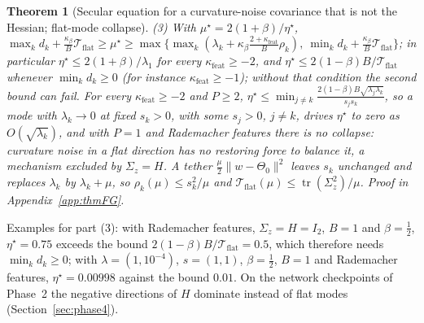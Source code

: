 \documentclass[11pt]{article}
\newtheorem{theorem}{Theorem}
\theoremstyle{remark}
\newcommand{\tr}{\operatorname{tr}}
\begin{document}
\begin{theorem}[Secular equation for a curvature-noise covariance that is not the Hessian; flat-mode collapse]
(3) With $\mu^\star=2(1+\beta)/\eta^\star$, $\max_kd_k+\frac{\kappa_\beta}{B}\mathcal T_{\mathrm{flat}}\ge\mu^\star\ge\max\big\{\max_k(\lambda_k+\kappa_\beta\frac{2+\kappa_{\mathrm{feat}}}{B}\rho_k),\ \min_kd_k+\frac{\kappa_\beta}{B}\mathcal T_{\mathrm{flat}}\big\}$; in particular $\eta^\star\le2(1+\beta)/\lambda_1$ for every $\kappa_{\mathrm{feat}}\ge-2$, and $\eta^\star\le2(1-\beta)B/\mathcal T_{\mathrm{flat}}$ whenever $\min_kd_k\ge0$ (for instance $\kappa_{\mathrm{feat}}\ge-1$); without that condition the second bound can fail. For every $\kappa_{\mathrm{feat}}\ge-2$ and $P\ge2$, $\eta^\star\le\min_{j\ne k}\frac{2(1-\beta)B\sqrt{\lambda_j\lambda_k}}{s_js_k}$, so a mode with $\lambda_k\to0$ at fixed $s_k>0$, with some $s_j>0$, $j\ne k$, drives $\eta^\star$ to zero as $O(\sqrt{\lambda_k})$, and with $P=1$ and Rademacher features there is no collapse: curvature noise in a flat direction has no restoring force to balance it, a mechanism excluded by $\Sigma_z=H$. A tether $\frac\mu2\|w-\Theta_0\|^2$ leaves $s_k$ unchanged and replaces $\lambda_k$ by $\lambda_k+\mu$, so $\rho_k(\mu)\le s_k^2/\mu$ and $\mathcal T_{\mathrm{flat}}(\mu)\le\tr(\Sigma_z^2)/\mu$. Proof in Appendix~\ref{app:thmFG}.
\end{theorem}
Examples for part (3): with Rademacher features, $\Sigma_z=H=I_2$, $B=1$ and $\beta=\frac12$, $\eta^\star=0.75$ exceeds the bound $2(1-\beta)B/\mathcal T_{\mathrm{flat}}=0.5$, which therefore needs $\min_kd_k\ge0$; with $\lambda=(1,10^{-4})$, $s=(1,1)$, $\beta=\frac12$, $B=1$ and Rademacher features, $\eta^\star=0.00998$ against the bound $0.01$. On the network checkpoints of Phase~2 the negative directions of $H$ dominate instead of flat modes (Section~\ref{sec:phase4}).
\end{document}
